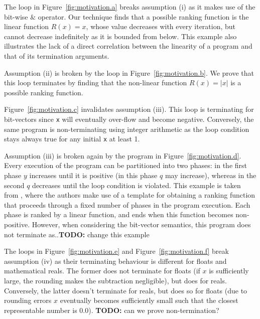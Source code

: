 \documentclass[preprint]{sigplanconf}
\theoremstyle{definition}
\newcommand{\todo}[1]{{\bf TODO:} #1}
\begin{document}
The loop in Figure~\ref{fig:motivation.a} breaks assumption (i) as it makes use of the bit-wise $\&$ operator.
Our technique finds that a possible ranking function is the linear function
$R(x) = x$, whose value decreases with
every iteration, but cannot decrease indefinitely as it is bounded from below.
This example also illustrates the lack of a direct correlation between the linearity of a program and that of its termination arguments.

Assumption (ii) is broken by the loop in Figure~\ref{fig:motivation.b}.
We prove that this loop terminates by finding that the non-linear function $R(x) = |x|$ is a possible ranking function.

Figure~\ref{fig:motivation.c} invalidates assumption (iii). 
This loop is  terminating for bit-vectors since \texttt{x}
will eventually over-flow and become negative. Conversely, the same program is non-terminating using integer
arithmetic as the loop condition stays always true for any initial \texttt{x} at least 1.

Assumption (iii) is broken again by the program in Figure~\ref{fig:motivation.d}. Every execution of the program can be partitioned into two phases: 
in the first phase $y$ increases until it is positive (in this phase $q$ may increase), whereas in the second $q$ decreases until the loop condition is violated. 
This example is taken from \cite{DBLP:conf/tacas/LeikeH14}, where the authors make use of a template for obtaining a ranking function that proceeds
through a fixed number of phases in the program execution. Each phase is ranked by a linear function, and ends when this function becomes non-positive.
However, when considering the bit-vector semantics, this program does not terminate as..\todo{change this example}

The loops in Figure~\ref{fig:motivation.e} and Figure~\ref{fig:motivation.f} break assumption (iv) as their terminating behaviour is different 
for floats and mathematical reals. 
The former does not terminate for floats (if $x$ is sufficiently large, the rounding makes the subtraction negligible), but does for reals. Conversely, the latter 
doesn't terminate for reals, but does so for floats (due to rounding errors $x$ eventually becomes sufficiently small 
such that the closest representable number is 0.0). \todo{can we prove non-termination?}
\end{document}
